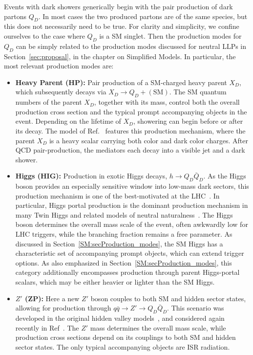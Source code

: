 Events with dark showers generically begin with the pair production of dark partons $Q_D$. In most cases the two produced partons are of the same species, but this does not necessarily need to be true. For clarity and simplicity, we  confine ourselves to the case where $Q_D$ is a SM singlet. Then the production modes for $Q_D$ can be simply related to the production modes discussed for neutral LLPs in Section~\ref{sec:proposal}, in the chapter on Simplified Models. In particular, the most relevant production modes are:
%
\begin{itemize}

\item {\bf Heavy Parent (HP):} Pair production of a SM-charged heavy parent $X_D$, which subsequently decays via $X_D\to Q_D+\mathrm{(SM)}$. The SM quantum numbers of the parent $X_D$, together with its mass, control both the overall production cross section and the typical prompt accompanying objects in the event. Depending on the lifetime of $X_D$, showering can begin before or after its decay. The model of Ref.~\cite{Schwaller:2015gea} features this production mechanism, where the parent $X_D$ is a heavy scalar carrying both color and dark color charges. After QCD pair-production, the mediators each decay into a visible jet and a dark shower.

\item {\bf Higgs (HIG):} Production in exotic Higgs decays, $h\to Q_D\bar Q_D$. As the Higgs boson provides an especially sensitive window into low-mass dark sectors, this production mechanism is one of the best-motivated at the LHC~\cite{Strassler:2006ri,Curtin:2013fra}. In particular, Higgs portal production is the dominant production mechanism in many Twin Higgs and related models of neutral naturalness~\cite{Craig:2015pha,Craig:2016kue,Curtin:2015fna}. The Higgs boson determines the overall mass scale of the event, often awkwardly low for LHC triggers, while the branching fraction remains a free parameter. As discussed in Section~\ref{SM:secProduction_modes}, the SM Higgs has a characteristic set of accompanying prompt objects, which can extend trigger options. As also emphasized in Section~\ref{SM:secProduction_modes}, this category additionally encompasses production through parent Higgs-portal scalars, which may be either heavier or lighter than the SM Higgs.

\item {\bf $Z'$ (ZP):} Here a new $Z'$ boson couples to both SM and hidden sector states, allowing for production through $q\bar q \to Z'\to Q_D\bar Q_D$. This scenario was developed in the original hidden valley models~\cite{Strassler:2006im,Han:2007ae}, and considered again recently in Ref~\cite{Cohen:2015toa}. The $Z'$ mass determines the overall mass scale, while production cross sections depend on its couplings to both SM and hidden sector states. The only typical accompanying objects are ISR radiation.


\end{itemize}
